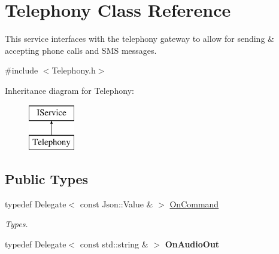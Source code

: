 \hypertarget{class_telephony}{}\section{Telephony Class Reference}
\label{class_telephony}


This service interfaces with the telephony gateway to allow for sending \& accepting phone calls and S\+MS messages.  




{\ttfamily \#include $<$Telephony.\+h$>$}

Inheritance diagram for Telephony\+:\begin{figure}[H]
\begin{center}
\leavevmode
\includegraphics[height=2.000000cm]{class_telephony}
\end{center}
\end{figure}
\subsection*{Public Types}
\begin{DoxyCompactItemize}
\item 
\mbox{\label{class_telephony_ab5c5a24d45eb0612478a26dfbf11a168}} 
typedef Delegate$<$ const Json\+::\+Value \& $>$ \hyperlink{class_telephony_ab5c5a24d45eb0612478a26dfbf11a168}{On\+Command}
\begin{DoxyCompactList}\small\item\em Types. \end{DoxyCompactList}\item 
\mbox{\label{class_telephony_ace72764fd16a6bf7ddf18b3e7c2ed217}} 
typedef Delegate$<$ const std\+::string \& $>$ {\bfseries On\+Audio\+Out}
\end{DoxyCompactItemize}
